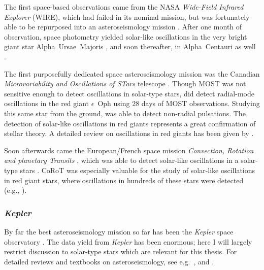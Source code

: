 The first space-based observations came from the NASA \emph{Wide-Field Infrared Explorer} (\textsc{WIRE}), which had failed in its nominal mission, but was fortunately able to be repurposed into an asteroseismology mission \citep{2000ASPC..198..557B}. 
After one month of observation, space photometry yielded solar-like oscillations in the very bright giant star Alpha~Ursae~Majoris \citep{2000ApJ...532L.133B}, and soon thereafter, in Alpha~Centauri as well \citep{2001ESASP.464..391S}. 

The first purposefully dedicated space asteroseismology mission was the Canadian \emph{Microvariability and Oscillations of STars} telescope \citep[\textsc{MOST},][duration 2003--2014]{2003PASP..115.1023W}. 
Though \textsc{MOST} was not sensitive enough to detect oscillations in solar-type stars, \citet{2006ESASP.624E..30B, 2007A&A...468.1033B} did detect radial-mode oscillations in the red giant $\epsilon$~Oph using $28$ days of MOST observations. 
Studying this same star from the ground, \citet{2006A&A...454..943H} was able to detect non-radial pulsations. 
The detection of solar-like oscillations in red giants represents a great confirmation of stellar theory. 
A detailed review on oscillations in red giants has been given by \citet{2017A&ARv..25....1H}. 

Soon afterwards came the European/French space mission \emph{Convection, Rotation and planetary Transits} \citep[\textsc{CoRoT},][duration 2006--2012]{2006ESASP1306...33B}, which was able to detect solar-like oscillations in a solar-type stars \citep{2010A&A...515A..87D}. 
CoRoT was especially valuable for the study of solar-like oscillations in red giant stars, where oscillations in hundreds of these stars were detected (e.g., \citealt{2009Natur.459..398D, 2009A&A...506..465H}). 


\subsubsection*{\emph{Kepler}}

By far the best asteroseismology mission so far has been the \emph{Kepler} space observatory \citep[][duration 2009--2013]{2010ApJ...713L..79K}. 
The data yield from \emph{Kepler} has been enormous; here I will largely restrict discussion to solar-type stars which are relevant for this thesis. 
For detailed reviews and textbooks on asteroseismology, see e.g.\ \citealt{2010aste.book.....a, 2012AN....333..914C, 2013adspr..52.1581h, 2013ARA&A..51..353C}, and \citealt{basuchaplin2017}. 


